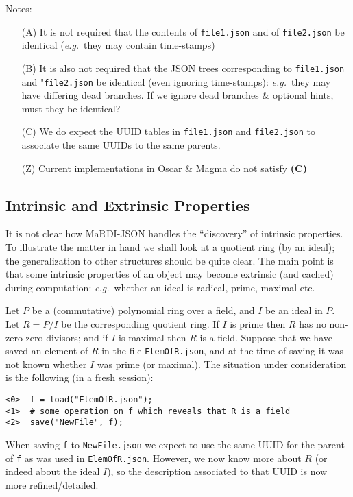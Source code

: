 \documentclass{article}
\newcommand{\MaRDIJSON}{MaRDI-JSON}
\newcommand \eg {\textit{e.g.}}
\begin{document}
Notes:
\begin{itemize}
\item[(A)]  It is not required that the contents of \verb|file1.json| and of
     \verb|file2.json| be identical (\eg~they may contain time-stamps)

\item[(B)]  It is also not required that the JSON trees corresponding to
     \verb|file1.json| and "\verb|file2.json| be identical (even ignoring
     time-stamps): \eg~they may have differing dead branches.  If we ignore
     dead branches {\&} optional hints, must they be identical?

\item[(C)]  We do expect the UUID tables in \verb|file1.json| and \verb|file2.json|
     to associate the same UUIDs to the same parents.

\item[(Z)] Current implementations in Oscar {\&} Magma do not satisfy \textbf{(C)}
\end{itemize}


\subsection{Intrinsic and Extrinsic Properties}

It is not clear how {\MaRDIJSON} handles the ``discovery'' of
intrinsic properties.  To illustrate the matter in hand we shall look
at a quotient ring (by an ideal); the generalization to other
structures should be quite clear.  The main point is that some
intrinsic properties of an object may become extrinsic (and cached)
during computation: \eg~whether an ideal is radical, prime, maximal
etc.

Let $P$ be a (commutative) polynomial ring over a field, and $I$ be an
ideal in $P$.  Let $R = P/I$ be the corresponding quotient ring.  If
$I$ is prime then $R$ has no non-zero zero divisors; and if $I$ is
maximal then $R$ is a field.  Suppose that we have saved an element
of $R$ in the file \verb|ElemOfR.json|, and at the time of saving
it was not known whether $I$ was prime (or maximal).
The situation under consideration is the following (in a fresh session):
\begin{verbatim}
<0>  f = load("ElemOfR.json");
<1>  # some operation on f which reveals that R is a field
<2>  save("NewFile", f);
\end{verbatim}
When saving \verb|f| to \verb|NewFile.json| we expect to use the same
UUID for the parent of \verb|f| as was used in \verb|ElemOfR.json|.
However, we now know more about $R$ (or indeed about the ideal $I$),
so the description associated to that UUID is now more refined/detailed.
\end{document}
